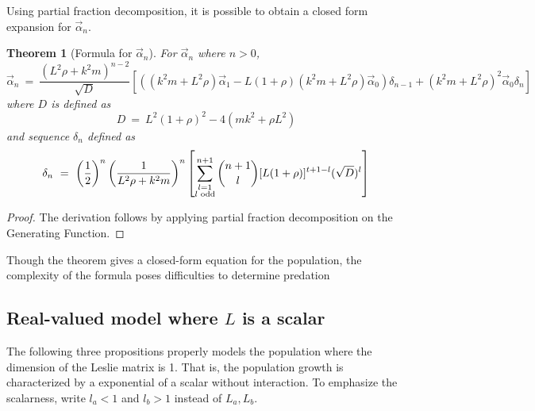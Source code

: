 \documentclass{article}
\newtheorem{theorem}{Theorem}[section]
\newtheorem{theorem}{Theorem}
\numberwithin{equation}{section}
\begin{document}
Using partial fraction decomposition, it is possible to obtain 
a closed form expansion for $\vec \alpha_n$. 

\begin{theorem} [Formula for $\vec \alpha_n$]
    For $\vec \alpha_n$ where $n > 0$, 
    \begin{equation}
    \vec \alpha_n \ = \ 
    \frac {
(L^2 \rho + k^2 m)^{n - 2}
    } {\sqrt D} 
    \left[
        \left(
            (k^2m + L^2 \rho) \vec \alpha_1 - L(1 + \rho) 
\left(
            k^2m + L^2\rho
        \right)
            \vec \alpha_0
        \right)\delta_{n - 1}
        + \left(
            k^2m + L^2\rho
        \right)^2\vec \alpha_0 \delta_{n}
    \right]
    \end{equation}
    where $D$ is defined as
    \begin{equation}
        D \ = \ L ^2 (1 + \rho)^2 - 4 (mk^2 + \rho L^2)
    \end{equation}
    and sequence $\delta_n$ defined as 
    \begin{equation}
        \delta_n \ = \ 
        \left(
            \frac 1 2
        \right)^n 
        \left(
            \frac 1 {
                L^2 \rho + k^2 m
            }
        \right)^{n}
        \left[
            \sum_{\substack{l = 1 \\ l \textnormal{ odd}}}^{n + 1}
            \binom{n + 1}{l} 
            [L(1+\rho)]^{t + 1 - l}(\sqrt D)^l
        \right]
    \end{equation}
\end{theorem}

\begin{proof}
    The derivation follows by applying partial fraction decomposition on the 
    Generating Function. 
\end{proof}

Though the theorem gives a closed-form equation for the population, 
the complexity of the formula poses difficulties to determine 
predation 

\subsection{Real-valued model where $L$ is a scalar}


The following three propositions properly models 
the population where the dimension of the Leslie matrix 
is 1. That is, the population growth is characterized 
by a exponential of a scalar without interaction. 
To emphasize the scalarness, write $l_a < 1$ and $l_b > 1$ 
instead of $L_a, L_b$. 
\end{document}
